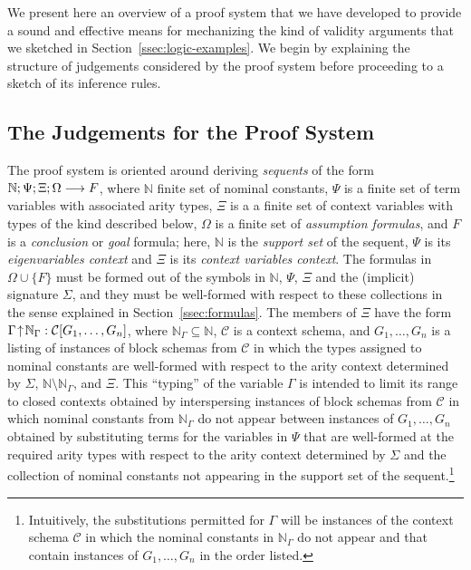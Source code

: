 We present here an overview of a proof system that we have developed
to provide a sound and effective means for mechanizing the kind of
validity arguments that we sketched in Section~\ref{ssec:logic-examples}.
%
We begin by explaining the structure of judgements considered by the
proof system before proceeding to a sketch of its inference rules.

\subsection{The Judgements for the Proof System}\label{ssec:sequents}

The proof system is oriented around deriving \emph{sequents} of the
form $\mathbb{N};\Psi;\Xi;\Omega\longrightarrow F$, where $\mathbb{N}$
finite set of nominal constants, $\Psi$ is a finite set of term
variables with associated arity types, $\Xi$ is a a finite set of
context variables with types of the kind described below, 
$\Omega$ is a finite set of \emph{assumption formulas}, and $F$ is a
\emph{conclusion} or \emph{goal} formula; 
here, $\mathbb{N}$ is the \emph{support set} of the
sequent, $\Psi$ is its \emph{eigenvariables context} and $\Xi$ is its
\emph{context variables context}.
%
The formulas in $\Omega \cup \{F\}$ must be formed out of the symbols
in $\mathbb{N}$, $\Psi$, $\Xi$ and the (implicit) signature $\Sigma$,
and they must be well-formed with respect to these collections in the
sense explained in Section~\ref{ssec:formulas}. 
%
The members of $\Xi$ have the form
$\Gamma\!\uparrow\!\mathbb{N}_{\Gamma} : \mathcal{C}\lbrack {G_1,\ldots,G_n}\rbrack$,
where $\mathbb{N}_{\Gamma} \subseteq \mathbb{N}$,
$\mathcal{C}$ is a context schema, and $G_1,\ldots,G_n$ is a listing of
instances of block schemas from $\mathcal{C}$ in which the types assigned to
nominal constants are well-formed with respect to the arity context
determined by $\Sigma$, $\mathbb{N} \setminus \mathbb{N}_\Gamma$, and $\Xi$. 
%
This ``typing'' of the variable $\Gamma$ is intended to limit its
range to closed contexts obtained by interspersing instances of block
schemas from $\mathcal{C}$ in which nominal constants from
$\mathbb{N}_\Gamma$ do not appear between instances of
$G_1,\ldots,G_n$ obtained by substituting terms for the variables in
$\Psi$ that are well-formed at the required arity types with respect
to the arity context determined by $\Sigma$ and the collection of
nominal constants not appearing in the support set of the
sequent.\footnote{Intuitively, the substitutions permitted for
  $\Gamma$ will be instances of the context schema $\mathcal{C}$ in
  which the nominal constants in $\mathbb{N}_\Gamma$ do not appear and
  that contain instances of $G_1,\ldots,G_n$ in the order listed.}

